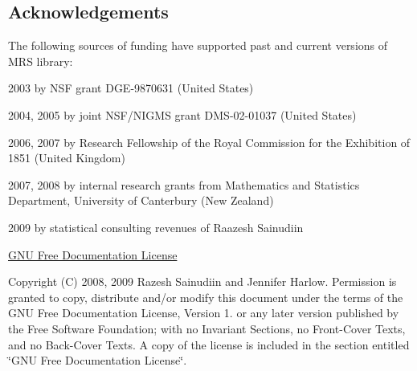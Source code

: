 \hypertarget{index_mainpage_sec_acknowledgements}{}\subsection{\-Acknowledgements}\label{index_mainpage_sec_acknowledgements}
\-The following sources of funding have supported past and current versions of \-M\-R\-S library\-:
\begin{DoxyItemize}
\item 2003 by \-N\-S\-F grant \-D\-G\-E-\/9870631 (\-United \-States)
\item 2004, 2005 by joint \-N\-S\-F/\-N\-I\-G\-M\-S grant \-D\-M\-S-\/02-\/01037 (\-United \-States)
\item 2006, 2007 by \-Research \-Fellowship of the \-Royal \-Commission for the \-Exhibition of 1851 (\-United \-Kingdom)
\item 2007, 2008 by internal research grants from \-Mathematics and \-Statistics \-Department, \-University of \-Canterbury (\-New \-Zealand)
\item 2009 by statistical consulting revenues of \-Raazesh \-Sainudiin
\end{DoxyItemize}





\hyperlink{GFDL}{\-G\-N\-U \-Free \-Documentation \-License}

\-Copyright (\-C) 2008, 2009 \-Razesh \-Sainudiin and \-Jennifer \-Harlow. \-Permission is granted to copy, distribute and/or modify this document under the terms of the \-G\-N\-U \-Free \-Documentation \-License, \-Version 1. or any later version published by the \-Free \-Software \-Foundation; with no \-Invariant \-Sections, no \-Front-\/\-Cover \-Texts, and no \-Back-\/\-Cover \-Texts. \-A copy of the license is included in the section entitled \char`\"{}\-G\-N\-U
    Free Documentation License\char`\"{}. 
